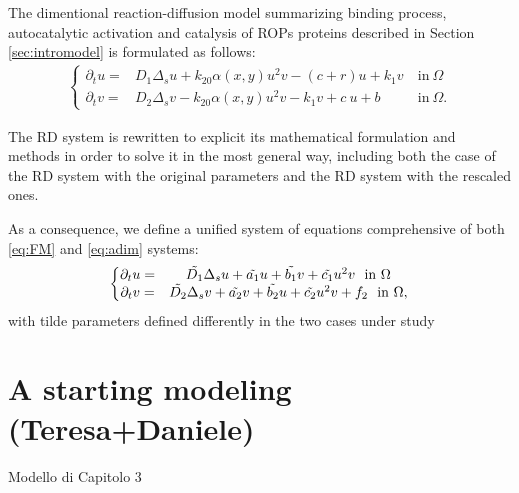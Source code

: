 \documentclass[a4paper]{siamonline220329}
\begin{document}
The dimentional reaction-diffusion model summarizing binding process, autocatalytic activation and catalysis of ROPs proteins described in Section \ref{sec:intromodel} is formulated as follows:
\begin{equation} \label{eq:FM}\begin{aligned}
\left\lbrace
\begin{matrix}
\partial_t u = & D_1 \Delta_s u + k_{20} \alpha(x,y)u^2 v - \left(c+r\right) u + k_1 v  & \ \text{in} \ \Omega\\
    \partial_t v = & D_2 \Delta_s v - k_{20} \alpha(x,y) u^2 v - k_1 v + c \ u + b   & \ \text{in} \ \Omega.
\end{matrix}
\right.
\end{aligned}\end{equation}

The RD system is rewritten to explicit its mathematical formulation and methods in order to solve it in the most general way, including both the case of the RD system with the original parameters and the RD system with the rescaled ones.

As a consequence, we define a unified system of equations comprehensive of both \eqref{eq:FM} and \eqref{eq:adim} systems:
\begin{equation} \label{eq:final}
\left\lbrace
\begin{matrix}
\partial_t u = & \Tilde{D_1} \Delta_s u + \Tilde{a_1} u + \Tilde{b_1} v + \Tilde{c_1} u^2 v \ \ \text{in} \ \Omega\\
\partial_t v = & \Tilde{D_2} \Delta_s v + \Tilde{a_2} v + \Tilde{b_2} u + \Tilde{c_2} u^2 v + f_2 \ \ \text{in} \ \Omega,
\end{matrix}
\right.
\end{equation}
with tilde parameters defined differently in the two cases under study

\section{A starting modeling  (Teresa+Daniele)}

Modello di Capitolo 3
\end{document}
